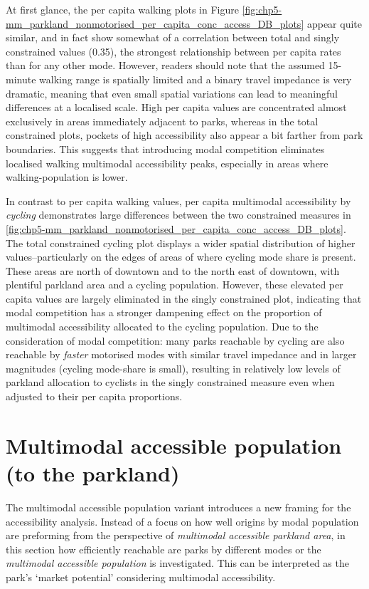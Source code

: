 \documentclass[
11pt, %
oneside, %
english, %
singlespacing, %
]{macthesis} %
\begin{document}
At first glance, the per capita walking plots in
Figure \ref{fig:chp5-mm_parkland_nonmotorised_per_capita_conc_access_DB_plots} appear
quite similar, and in fact show somewhat of a correlation between total and singly constrained values (0.35), the strongest relationship between per capita rates than for any other mode. However, readers should note that the assumed 15-minute walking range is spatially limited and a binary travel impedance is very dramatic, meaning that even small spatial variations can lead to meaningful differences at a localised scale. High per capita values are concentrated almost exclusively in areas immediately adjacent to parks, whereas in the total constrained plots, pockets of high accessibility also appear a bit farther from park boundaries. This suggests that introducing modal competition eliminates localised walking multimodal accessibility peaks, especially in areas where walking-population is lower.

In contrast to per capita walking values, per capita multimodal accessibility by \emph{cycling} demonstrates large differences between the two constrained measures in \ref{fig:chp5-mm_parkland_nonmotorised_per_capita_conc_access_DB_plots}. The total constrained cycling plot displays a wider spatial distribution of higher values--particularly on the edges of areas of where cycling mode share is present. These areas are north of downtown and to the north east of downtown, with plentiful parkland area and a cycling population. However, these elevated per capita values are largely eliminated in the singly constrained plot, indicating that modal competition has a stronger dampening effect on the proportion of multimodal accessibility allocated to the cycling population. Due to the consideration of modal competition: many parks reachable by cycling are also reachable by \emph{faster} motorised modes with similar travel impedance and in larger magnitudes (cycling mode-share is small), resulting in relatively low levels of parkland allocation to cyclists in the singly constrained measure even when adjusted to their per capita proportions.

\section{Multimodal accessible population (to the parkland)}\label{multimodal-accessible-population-to-the-parkland}

The multimodal accessible population variant introduces a new framing for the accessibility analysis. Instead of a focus on how well origins by modal population are preforming from the perspective of \emph{multimodal accessible parkland area}, in this section how efficiently reachable are parks by different modes or the \emph{multimodal accessible population} is investigated. This can be interpreted as the park's `market potential' considering multimodal accessibility.
\end{document}
